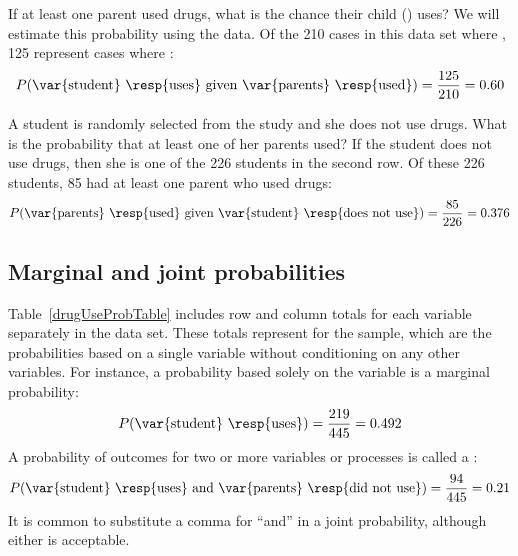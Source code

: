 \textPE{\pagebreak}

\begin{example}{If at least one parent used drugs, what is the chance their child () {uses}?}
We will estimate this probability using the data. Of the 210 cases in this data set where  , 125 represent cases where  :
\begin{eqnarray*}
P(\text{\var{student} \resp{uses} given \var{parents} \resp{used}}) = \frac{125}{210} = 0.60
\end{eqnarray*}
\end{example}

\begin{example}{A student is randomly selected from the study and she does not use drugs. What is the probability that at least one of her parents used?}\label{drugUseProbOfParentsGivenStudents}
If the student does not use drugs, then she is one of the 226 students in the second row. Of these 226 students, 85 had at least one parent who used drugs:
\begin{eqnarray*}
P(\text{\var{parents} \resp{used} given \var{student} \resp{does not use}}) = \frac{85}{226} = 0.376
\end{eqnarray*}
\end{example}

\subsection{Marginal and joint probabilities}
\label{marginalAndJointProbabilities}


Table~\ref{drugUseProbTable} includes row and column totals for each variable separately in the  data set. These totals represent  for the sample, which are the probabilities based on a single variable without conditioning on any other variables. For instance, a probability based solely on the  variable is a marginal probability:
\begin{eqnarray*}
P(\text{\var{student} \resp{uses}}) = \frac{219}{445} = 0.492
\end{eqnarray*}
A probability of outcomes for two or more variables or processes is called a :
\begin{eqnarray*}
P(\text{\var{student} \resp{uses} and \var{parents} \resp{did not use}}) = \frac{94}{445} = 0.21
\end{eqnarray*}
It is common to substitute a comma for ``and'' in a joint probability, although either is acceptable.

